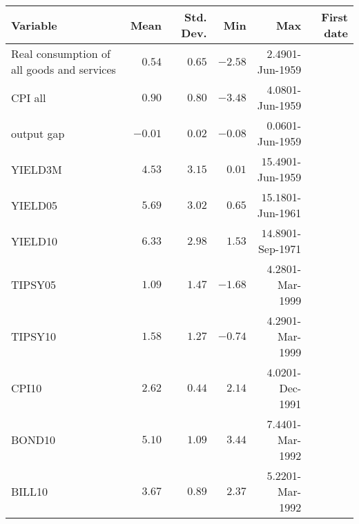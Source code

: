 \begin{tabular}{lrrrrr} \hline Variable & Mean & Std. Dev. & Min & Max & First date \\ \hline Real consumption of all goods and services & $0.54$ & $0.65$ & $-2.58$ & $2.49$01-Jun-1959 \\ CPI all  & $0.90$ & $0.80$ & $-3.48$ & $4.08$01-Jun-1959 \\ output gap & $-0.01$ & $0.02$ & $-0.08$ & $0.06$01-Jun-1959 \\ YIELD3M & $4.53$ & $3.15$ & $0.01$ & $15.49$01-Jun-1959 \\ YIELD05 & $5.69$ & $3.02$ & $0.65$ & $15.18$01-Jun-1961 \\ YIELD10 & $6.33$ & $2.98$ & $1.53$ & $14.89$01-Sep-1971 \\ TIPSY05 & $1.09$ & $1.47$ & $-1.68$ & $4.28$01-Mar-1999 \\ TIPSY10 & $1.58$ & $1.27$ & $-0.74$ & $4.29$01-Mar-1999 \\ CPI10 & $2.62$ & $0.44$ & $2.14$ & $4.02$01-Dec-1991 \\ BOND10 & $5.10$ & $1.09$ & $3.44$ & $7.44$01-Mar-1992 \\ BILL10 & $3.67$ & $0.89$ & $2.37$ & $5.22$01-Mar-1992 \\ \hline \end{tabular}